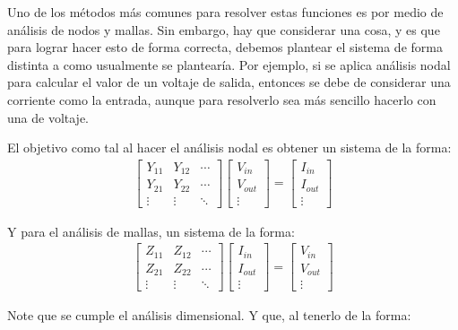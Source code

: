 \documentclass[12pt,letterpaper]{article}
\begin{document}
Uno de los métodos más comunes para resolver estas funciones es por medio de análisis de nodos y mallas. Sin embargo, hay que considerar una cosa, y es que para lograr hacer esto de forma correcta, debemos plantear el sistema de forma distinta a como usualmente se plantearía. Por ejemplo, si se aplica análisis nodal para calcular el valor de un voltaje de salida, entonces se debe de considerar una corriente como la entrada, aunque para resolverlo sea más sencillo hacerlo con una de voltaje.

El objetivo como tal al hacer el análisis nodal es obtener un sistema de la forma:
\begin{align*}
    \begin{bmatrix}
        Y_{11} & Y_{12} & \cdots \\
        Y_{21} & Y_{22} & \cdots \\
        \vdots & \vdots & \ddots
    \end{bmatrix}
    \begin{bmatrix}
        V_{in} \\
        V_{out} \\
        \vdots
    \end{bmatrix}
    =
    \begin{bmatrix}
        I_{in} \\
        I_{out} \\
        \vdots
    \end{bmatrix}
\end{align*}

Y para el análisis de mallas, un sistema de la forma:
\begin{align*}
    \begin{bmatrix}
        Z_{11} & Z_{12} & \cdots \\
        Z_{21} & Z_{22} & \cdots \\
        \vdots & \vdots & \ddots
    \end{bmatrix}
    \begin{bmatrix}
        I_{in} \\
        I_{out} \\
        \vdots
    \end{bmatrix}
    =
    \begin{bmatrix}
        V_{in} \\
        V_{out} \\
        \vdots
    \end{bmatrix}
\end{align*}

Note que se cumple el análisis dimensional. Y que, al tenerlo de la forma:
\end{document}
